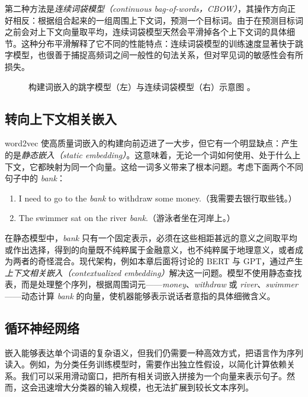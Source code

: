第二种方法是\emph{连续词袋模型（continuous bag-of-words，CBOW）}，其操作方向正好相反：根据组合起来的一组周围上下文词，预测一个目标词。由于在预测目标词之前会对上下文向量取平均，连续词袋模型天然会平滑掉各个上下文词的具体细节。这种分布平滑解释了它不同的性能特点：连续词袋模型的训练速度显著快于跳字模型，也很善于捕捉高频词之间一般性的句法关系，但对罕见词的敏感性会有所损失。

\begin{figure}[tb]
    \centering
    \begin{minipage}{0.45\textwidth}
        
    \end{minipage}
    \hfill
    \begin{minipage}{0.45\textwidth}
        
    \end{minipage}
    \caption{构建词嵌入的跳字模型（左）与连续词袋模型（右）示意图 \citep{d2l_cbow_2023}。}
    \label{fig:word2vec}
\end{figure}

\subsection{转向上下文相关嵌入}
word2vec 使高质量词嵌入的构建向前迈进了一大步，但它有一个明显缺点：产生的是\textit{静态嵌入（static embedding）}。这意味着，无论一个词如何使用、处于什么上下文，它都映射为同一个向量。这给一词多义带来了根本问题。考虑下面两个不同句子中的 \textit{bank}：
\begin{enumerate}
    \item I need to go to the \textit{bank} to withdraw some money.（我需要去银行取些钱。）
    \item The swimmer sat on the river \textit{bank}.（游泳者坐在河岸上。）
\end{enumerate}
在静态模型中，\textit{bank} 只有一个固定表示，必须在这些相距甚远的意义之间取平均或作出选择，得到的向量既不纯粹属于金融意义，也不纯粹属于地理意义，或者成为两者的奇怪混合。现代架构，例如本章后面将讨论的 BERT 与 GPT，通过产生\textit{上下文相关嵌入（contextualized embedding）}解决这一问题。模型不使用静态查找表，而是处理整个序列，根据周围词元——\textit{money}、\textit{withdraw} 或 \textit{river}、\textit{swimmer}——动态计算 \textit{bank} 的向量，使机器能够表示说话者意指的具体细微含义。

\subsection{循环神经网络}
嵌入能够表达单个词语的复杂语义，但我们仍需要一种高效方式，把语言作为序列读入。例如，为分类任务训练模型时，需要作出独立性假设，以简化计算依赖关系。我们可以采用滑动窗口，把所有相关词嵌入拼接为一个向量来表示句子。然而，这会迅速增大分类器的输入规模，也无法扩展到较长文本序列。

